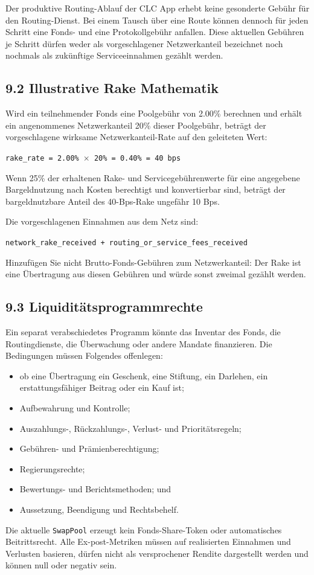 \documentclass[11pt]{article}
\begin{document}
Der produktive Routing-Ablauf der CLC App erhebt keine gesonderte Gebühr für den Routing-Dienst. Bei einem Tausch über eine Route können dennoch für jeden Schritt eine Fonds- und eine Protokollgebühr anfallen. Diese aktuellen Gebühren je Schritt dürfen weder als vorgeschlagener Netzwerkanteil bezeichnet noch nochmals als zukünftige Serviceeinnahmen gezählt werden.

\subsection*{9.2 Illustrative Rake Mathematik}

Wird ein teilnehmender Fonds eine Poolgebühr von 2.00\% berechnen und erhält ein angenommenes Netzwerkanteil 20\% dieser Poolgebühr, beträgt der vorgeschlagene wirksame Netzwerkanteil-Rate auf den geleiteten Wert:

\texttt{rake\_rate = 2.00\% $\times$ 20\% = 0.40\% = 40 bps}

Wenn 25\% der erhaltenen Rake- und Servicegebührenwerte für eine angegebene Bargeldnutzung nach Kosten berechtigt und konvertierbar sind, beträgt der bargeldnutzbare Anteil des 40-Bps-Rake ungefähr 10 Bps.

Die vorgeschlagenen Einnahmen aus dem Netz sind:

\texttt{network\_rake\_received + routing\_or\_service\_fees\_received}

Hinzufügen Sie nicht Brutto-Fonds-Gebühren zum Netzwerkanteil: Der Rake ist eine Übertragung aus diesen Gebühren und würde sonst zweimal gezählt werden.

\subsection*{9.3 Liquiditätsprogrammrechte}

Ein separat verabschiedetes Programm könnte das Inventar des Fonds, die Routingdienste, die Überwachung oder andere Mandate finanzieren. Die Bedingungen müssen Folgendes offenlegen:

\begin{itemize}[leftmargin=*]
\item ob eine Übertragung ein Geschenk, eine Stiftung, ein Darlehen, ein erstattungsfähiger Beitrag oder ein Kauf ist;
\item Aufbewahrung und Kontrolle;
\item Auszahlungs-, Rückzahlungs-, Verlust- und Prioritätsregeln;
\item Gebühren- und Prämienberechtigung;
\item Regierungsrechte;
\item Bewertungs- und Berichtsmethoden; und
\item Aussetzung, Beendigung und Rechtsbehelf.
\end{itemize}
Die aktuelle \texttt{SwapPool} erzeugt kein Fonds-Share-Token oder automatisches Beitrittsrecht. Alle Ex-post-Metriken müssen auf realisierten Einnahmen und Verlusten basieren, dürfen nicht als versprochener Rendite dargestellt werden und können null oder negativ sein.
\end{document}
